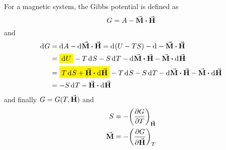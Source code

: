 \documentclass[../main/main.tex]{subfiles}
\begin{document}
For a magnetic system, the Gibbs potential is defined as
\begin{equation}
  G = A - \va{M} \vdot \va{H}
  \label{eq:}
\end{equation}
and
\begin{equation}
\begin{split}
\dd[]{G} &= \dd[]{A} - \dd[]{\va{M} \vdot \va{H}  }  = \dd[]{(U-T S)} - \dd[]{-\va{M} \vdot \va{H}  } \\
  & = \mathcolorbox{yellow}{\dd[]{U} } - T \dd[]{S} - S \dd[]{T} - \dd[]{\va{M} } \vdot \va{H} - \va{M} \vdot \dd[]{\va{H} }  \\
& = \mathcolorbox{yellow}{T \dd[]{S} + \va{H} \vdot \dd[]{\va{H} }} - T \dd[]{S} - S \dd[]{T} - \dd[]{\va{M} } \vdot \va{H} - \va{M} \vdot \dd[]{\va{H} } \\
 & = - S \dd[]{T} - \va{H}\vdot \dd[]{\va{H} }
\end{split}
  \label{eq:}
\end{equation}
and finally \( G=G(T,\va{H} ) \) and
\begin{subequations}
\begin{align}
  S &= - \qty(\pdv{G}{T} )_{\va{H} } \\
  \va{M}  &= - \qty(\pdv{G}{ \va{H} } )_{T}
\end{align}
\label{}
\end{subequations}
\end{document}
